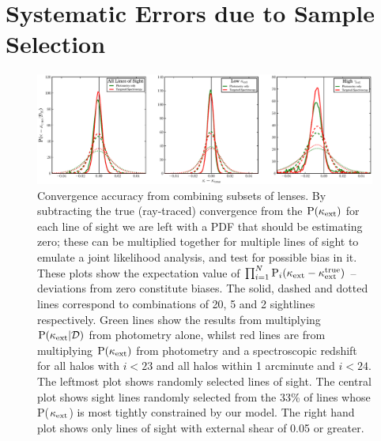 \documentclass[useAMS,usenatbib,a4paper]{mn2e}
\begin{document}


\section{Systematic Errors due to Sample Selection}
\label{sec:biases}

\begin{figure}
\includegraphics[width=\textwidth]{figs/biasplots.eps}
\caption{Convergence accuracy from combining subsets of
lenses. By subtracting the true (ray-traced) convergence from the
\infered ${\rm P}(\kappa_{\rm ext})$ for each line of sight we are left with a PDF that
should be estimating zero; these can be multiplied together for multiple
lines of sight to emulate a joint likelihood analysis, and 
test for possible bias in it. These plots show the
expectation value of $\prod_{i=1}^N {\rm P}_i(\kappa_{\rm ext}-\kappa_{\rm ext}^{\rm true})$ --
deviations from zero constitute biases. The solid, dashed and dotted
lines correspond to combinations of 
20, 5 and 2 sightlines respectively. Green lines show the results
from multiplying ${\rm P}(\kappa_{\rm ext}|{\mathcal{D}})$ \infered from photometry alone, whilst red
lines are from multiplying ${\rm P}(\kappa_{\rm ext})$ \infered from photometry and a
spectroscopic redshift for all halos with $i<23$ and all halos within 1
arcminute and $i<24$. The leftmost plot shows randomly selected lines
of sight. The central plot shows sight lines randomly selected from the
33\% of lines whose P($\kappa_{\rm ext}$) is most tightly constrained by our model. The right
hand plot shows only lines of sight with external shear of 0.05 or
greater.}
\label{fig:biasplots}
\end{figure}
\end{document}
